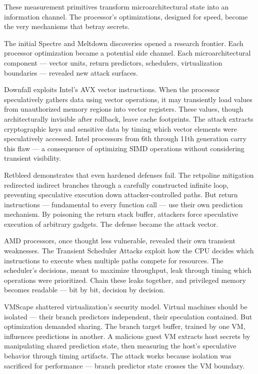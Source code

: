 These measurement primitives transform microarchitectural state into an information channel. The processor's optimizations, designed for speed, become the very mechanisms that betray secrets.

The initial Spectre and Meltdown discoveries opened a research frontier. Each processor optimization became a potential side channel. Each microarchitectural component — vector units, return predictors, schedulers, virtualization boundaries — revealed new attack surfaces.

Downfall exploits Intel's AVX vector instructions. When the processor speculatively gathers data using vector operations, it may transiently load values from unauthorized memory regions into vector registers. These values, though architecturally invisible after rollback, leave cache footprints. The attack extracts cryptographic keys and sensitive data by timing which vector elements were speculatively accessed. Intel processors from 6th through 11th generation carry this flaw — a consequence of optimizing SIMD operations without considering transient visibility.

Retbleed demonstrates that even hardened defenses fail. The retpoline mitigation redirected indirect branches through a carefully constructed infinite loop, preventing speculative execution down attacker-controlled paths. But return instructions — fundamental to every function call — use their own prediction mechanism. By poisoning the return stack buffer, attackers force speculative execution of arbitrary gadgets. The defense became the attack vector.

AMD processors, once thought less vulnerable, revealed their own transient weaknesses. The Transient Scheduler Attacks exploit how the CPU decides which instructions to execute when multiple paths compete for resources. The scheduler's decisions, meant to maximize throughput, leak through timing which operations were prioritized. Chain these leaks together, and privileged memory becomes readable — bit by bit, decision by decision.

VMScape shattered virtualization's security model. Virtual machines should be isolated — their branch predictors independent, their speculation contained. But optimization demanded sharing. The branch target buffer, trained by one VM, influences predictions in another. A malicious guest VM extracts host secrets by manipulating shared prediction state, then measuring the host's speculative behavior through timing artifacts. The attack works because isolation was sacrificed for performance — branch predictor state crosses the VM boundary.

